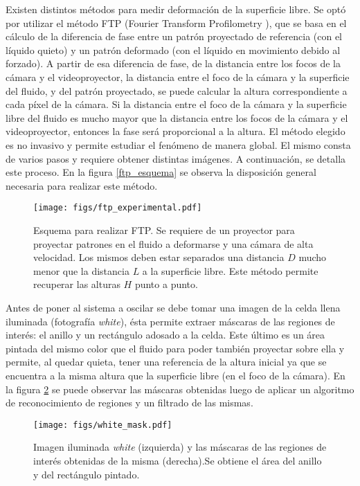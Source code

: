 \documentclass[../main.tex]{subfiles}
\begin{document}
Existen distintos métodos para medir deformación de la superficie libre. Se optó por utilizar el método FTP (Fourier Transform Profilometry \cite{takeda_fourier-transform_1982}), que se basa en el cálculo de la diferencia de fase entre un patrón proyectado de referencia (con el líquido quieto) y un patrón deformado (con el líquido en movimiento debido al forzado). A partir de esa diferencia de fase, de la distancia entre los focos de la cámara y el videoproyector, la distancia entre el foco de la cámara y la superficie del fluido, y del patrón proyectado, se puede calcular la altura correspondiente a cada píxel de la cámara. Si la distancia entre el foco de la cámara y la superficie libre del fluido es mucho mayor que la distancia entre los focos de la cámara y el videoproyector, entonces la fase será proporcional a la altura. El método elegido es no invasivo y permite estudiar el fenómeno de manera global. El mismo consta de varios pasos y requiere obtener distintas imágenes. A continuación, se detalla este proceso. En la figura \ref{ftp_esquema} se observa la disposición general necesaria para realizar este método. 

\begin{figure}[H]
    \centering
    \texttt{[image: figs/ftp\_experimental.pdf]}
    \caption{Esquema para realizar FTP. Se requiere de un proyector para proyectar patrones en el fluido a deformarse y una cámara de alta velocidad. Los mismos deben estar separados una distancia $D$ mucho menor que la distancia $L$ a la superficie libre. Este método permite recuperar las alturas $H$ punto a punto.}
    \label{fig:ftp_esquema} 
\end{figure}

Antes de poner al sistema a oscilar se debe tomar una imagen de la celda llena iluminada (fotografía \textit{white}), ésta permite extraer máscaras de las regiones de interés: el anillo y un rectángulo adosado a la celda. Este último es un área pintada del mismo color que el fluido para poder también proyectar sobre ella y permite, al quedar quieta, tener una referencia de la altura inicial ya que se encuentra a la misma altura que la superficie libre (en el foco de la cámara). En la figura \ref{fig:white_mask} se puede observar las máscaras obtenidas luego de aplicar un algoritmo de reconocimiento de regiones y un filtrado de las mismas. 

\begin{figure}[H]
    \centering
    \texttt{[image: figs/white\_mask.pdf]}
    \caption{Imagen iluminada \textit{white} (izquierda) y las máscaras de las regiones de interés obtenidas de la misma (derecha).Se obtiene el área del anillo y del rectángulo pintado. }
    \label{fig:white_mask}
\end{figure}
\end{document}
